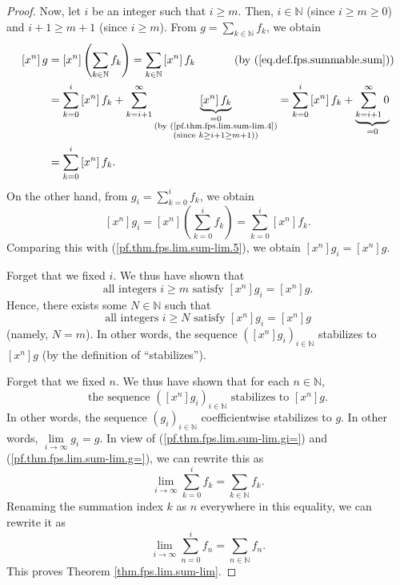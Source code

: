 \begin{fineprint}
\begin{proof}
Now, let $i$ be an integer such that $i\geq m$. Then, $i\in\mathbb{N}$ (since
$i\geq m\geq0$) and $i+1\geq m+1$ (since $i\geq m$). From $g=\sum
_{k\in\mathbb{N}}f_{k}$, we obtain%
\begin{align}
\left[  x^{n}\right]  g  &  =\left[  x^{n}\right]  \left(  \sum_{k\in
\mathbb{N}}f_{k}\right)  =\sum_{k\in\mathbb{N}}\left[  x^{n}\right]
f_{k}\ \ \ \ \ \ \ \ \ \ \left(  \text{by (\ref{eq.def.fps.summable.sum}%
)}\right) \nonumber\\
&  =\sum_{k=0}^{i}\left[  x^{n}\right]  f_{k}+\sum_{k=i+1}^{\infty
}\underbrace{\left[  x^{n}\right]  f_{k}}_{\substack{=0\\\text{(by
(\ref{pf.thm.fps.lim.sum-lim.4})}\\\text{(since }k\geq i+1\geq m+1\text{))}%
}}=\sum_{k=0}^{i}\left[  x^{n}\right]  f_{k}+\underbrace{\sum_{k=i+1}^{\infty
}0}_{=0}\nonumber\\
&  =\sum_{k=0}^{i}\left[  x^{n}\right]  f_{k}.
\label{pf.thm.fps.lim.sum-lim.5}%
\end{align}
On the other hand, from $g_{i}=\sum_{k=0}^{i}f_{k}$, we obtain%
\[
\left[  x^{n}\right]  g_{i}=\left[  x^{n}\right]  \left(  \sum_{k=0}^{i}%
f_{k}\right)  =\sum_{k=0}^{i}\left[  x^{n}\right]  f_{k}.
\]
Comparing this with (\ref{pf.thm.fps.lim.sum-lim.5}), we obtain $\left[
x^{n}\right]  g_{i}=\left[  x^{n}\right]  g$.

Forget that we fixed $i$. We thus have shown that
\[
\text{all integers }i\geq m\text{ satisfy }\left[  x^{n}\right]  g_{i}=\left[
x^{n}\right]  g.
\]
Hence, there exists some $N\in\mathbb{N}$ such that
\[
\text{all integers }i\geq N\text{ satisfy }\left[  x^{n}\right]  g_{i}=\left[
x^{n}\right]  g
\]
(namely, $N=m$). In other words, the sequence $\left(  \left[  x^{n}\right]
g_{i}\right)  _{i\in\mathbb{N}}$ stabilizes to $\left[  x^{n}\right]  g$ (by
the definition of \textquotedblleft stabilizes\textquotedblright).

Forget that we fixed $n$. We thus have shown that for each $n\in\mathbb{N}$,%
\[
\text{the sequence }\left(  \left[  x^{n}\right]  g_{i}\right)  _{i\in
\mathbb{N}}\text{ stabilizes to }\left[  x^{n}\right]  g.
\]
In other words, the sequence $\left(  g_{i}\right)  _{i\in\mathbb{N}}$
coefficientwise stabilizes to $g$. In other words, $\lim\limits_{i\rightarrow
\infty}g_{i}=g$. In view of (\ref{pf.thm.fps.lim.sum-lim.gi=}) and
(\ref{pf.thm.fps.lim.sum-lim.g=}), we can rewrite this as%
\[
\lim\limits_{i\rightarrow\infty}\sum_{k=0}^{i}f_{k}=\sum_{k\in\mathbb{N}}%
f_{k}.
\]
Renaming the summation index $k$ as $n$ everywhere in this equality, we can
rewrite it as%
\[
\lim\limits_{i\rightarrow\infty}\sum_{n=0}^{i}f_{n}=\sum_{n\in\mathbb{N}}%
f_{n}.
\]
This proves Theorem \ref{thm.fps.lim.sum-lim}.
\end{proof}


\end{fineprint}
